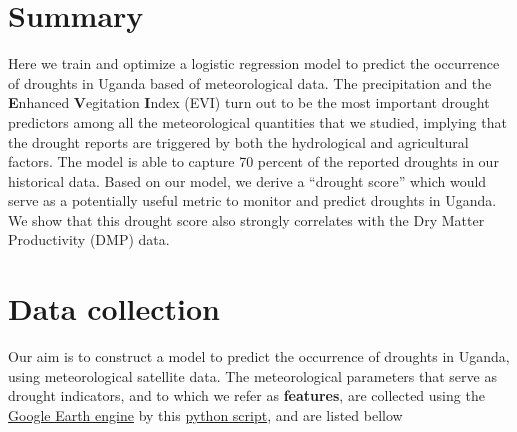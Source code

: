 \documentclass[10pt,parskip=half,
toc=sectionentrywithdots,
bibliography=totocnumbered,
captions=tableheading,numbers=noendperiod]{scrartcl}
\begin{document}
    \begingroup
    \let\cleardoublepage\relax
    \let\clearpage\relax
    \endgroup

\hypertarget{summary}{%
\section{Summary}\label{summary}}

Here we train and optimize a logistic regression model to predict the
occurrence of droughts in Uganda based of meteorological data. The
precipitation and the \textbf{E}nhanced \textbf{V}egitation
\textbf{I}ndex (EVI) turn out to be the most important drought
predictors among all the meteorological quantities that we studied,
implying that the drought reports are triggered by both the hydrological
and agricultural factors. The model is able to capture 70 percent of the
reported droughts in our historical data. Based on our model, we derive
a ``drought score'' which would serve as a potentially useful metric to
monitor and predict droughts in Uganda. We show that this drought score
also strongly correlates with the Dry Matter Productivity (DMP) data.

\hypertarget{data-collection}{%
\section{Data collection}\label{data-collection}}

Our aim is to construct a model to predict the occurrence of droughts in
Uganda, using meteorological satellite data. The meteorological
parameters that serve as drought indicators, and to which we refer as
\textbf{features}, are collected using the
\href{https://developers.google.com/earth-engine/python_install}{Google
Earth engine} by this
\href{https://github.com/rodekruis/IBF-system/blob/master/trigger-model-development/drought/skill-assessment/GoogleEarthEngine/GEE_get_data.py}{python
script}, and are listed bellow
\end{document}
